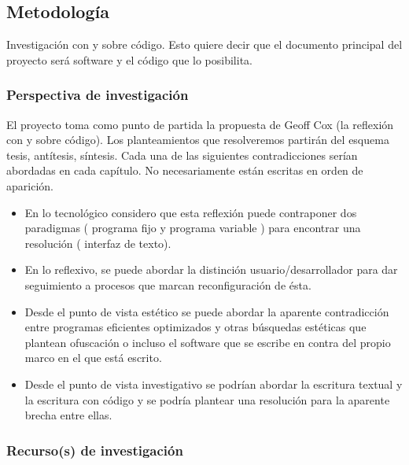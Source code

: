 \documentclass[12pt,a4paper, openright,
headinclude,footinclude,BCOR5mm,
numbers=noenddot,cleardoublepage=empty,
tablecaptionabove]{article}
\begin{document}
\subsection{Metodología}


Investigación con y sobre código. Esto quiere decir que el documento principal del proyecto será software y el código que lo posibilita.

\subsubsection{Perspectiva de investigación}

El proyecto toma como punto de partida la propuesta de Geoff Cox (la reflexión con y sobre código). Los planteamientos que resolveremos partirán del esquema tesis, antítesis, síntesis. Cada una de las siguientes contradicciones serían abordadas en cada capítulo. No necesariamente están escritas en orden de aparición.


\begin{itemize}

\item En lo tecnológico considero que esta reflexión puede contraponer dos paradigmas ( programa fijo y programa variable ) para encontrar una resolución ( interfaz de texto).  

\item En lo reflexivo, se puede abordar la distinción usuario/desarrollador para dar seguimiento a procesos que marcan reconfiguración de ésta.

\item Desde el punto de vista estético se puede abordar la aparente contradicción entre programas eficientes optimizados y otras búsquedas estéticas que plantean ofuscación o incluso el software que se escribe en contra del propio marco en el que está escrito.

\item Desde el punto de vista investigativo se podrían abordar la escritura textual y la escritura con código y se podría plantear una resolución para la aparente brecha entre ellas.

\end{itemize}

\subsubsection{Recurso(s) de investigación}
\end{document}
